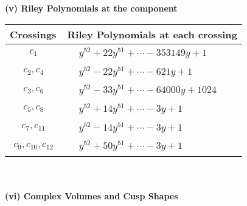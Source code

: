 \documentclass[1p]{elsarticle_modified}
\theoremstyle{definition}
\begin{document}
\newpage\renewcommand{\arraystretch}{1}
\flushleft \textbf{(v) Riley Polynomials at the component}\newline \\
\begin{tabular}{m{50pt}|m{274pt}}
Crossings & \hspace{64pt}Riley Polynomials at each crossing \\
\hline $$\begin{aligned}c_{1}\end{aligned}$$&$\begin{aligned}
&y^{52}+22 y^{51}+\cdots-353149 y+1
\end{aligned}$\\
\hline $$\begin{aligned}c_{2},c_{4}\end{aligned}$$&$\begin{aligned}
&y^{52}-22 y^{51}+\cdots-621 y+1
\end{aligned}$\\
\hline $$\begin{aligned}c_{3},c_{6}\end{aligned}$$&$\begin{aligned}
&y^{52}-33 y^{51}+\cdots-64000 y+1024
\end{aligned}$\\
\hline $$\begin{aligned}c_{5},c_{8}\end{aligned}$$&$\begin{aligned}
&y^{52}+14 y^{51}+\cdots-3 y+1
\end{aligned}$\\
\hline $$\begin{aligned}c_{7},c_{11}\end{aligned}$$&$\begin{aligned}
&y^{52}-14 y^{51}+\cdots-3 y+1
\end{aligned}$\\
\hline $$\begin{aligned}c_{9},c_{10},c_{12}\end{aligned}$$&$\begin{aligned}
&y^{52}+50 y^{51}+\cdots-3 y+1
\end{aligned}$\\
\hline
\end{tabular}\\~\\
\newpage\flushleft \textbf{(vi) Complex Volumes and Cusp Shapes}
\end{document}
